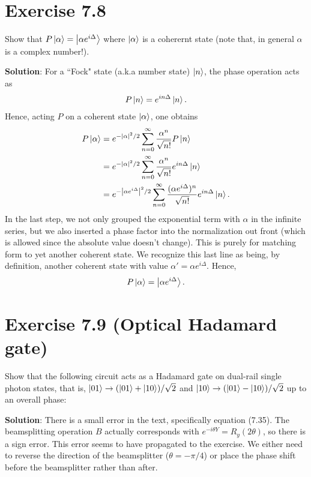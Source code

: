 \documentclass{book}
\begin{document}
\section*{Exercise 7.8}
    Show that $P\ket{\alpha} = \ket{\alpha e^{i\Delta}}$ where $\ket{\alpha}$ is a coherernt state (note that, in general $\alpha$ is a complex number!).

    \textbf{Solution}: For a ``Fock" state (a.k.a number state) $\ket{n}$, the phase operation acts as 
    \begin{align}
        P\ket{n} = e^{i n \Delta} \ket{n}.
    \end{align}
    Hence, acting $P$ on a coherent state $\ket{\alpha}$, one obtains
    \begin{align}
    \begin{aligned}
        P \ket{\alpha} &= e^{-\abs{\alpha}^2/2} \sum_{n=0}^\infty \frac{\alpha^n}{\sqrt{n!}} P\ket{n} \\
        &= e^{-\abs{\alpha}^2/2} \sum_{n=0}^\infty \frac{\alpha^n}{\sqrt{n!}} e^{i n\Delta}\ket{n} \\
        &= e^{-\abs{\alpha e^{i\Delta}}^2/2} \sum_{n=0}^\infty \frac{(\alpha e^{i\Delta})^n}{\sqrt{n!}} e^{i n\Delta}\ket{n}.
    \end{aligned}
    \end{align}
    In the last step, we not only grouped the exponential term with $\alpha$ in the infinite series, but we also inserted a phase factor into the normalization out front (which is allowed since the absolute value doesn't change). This is purely for matching form to yet another coherent state. We recognize this last line as being, by definition, another coherent state with value $\alpha' = \alpha e^{i\Delta}$. Hence,
    \begin{align}
        P\ket{\alpha} = \ket{\alpha e^{i\Delta}}.
    \end{align}

\section*{Exercise 7.9 (Optical Hadamard gate)}
    Show that the following circuit acts as a Hadamard gate on  dual-rail single photon states, that is, $\ket{01} \to (\ket{01} + \ket{10})/\sqrt{2}$ and $\ket{10}\to (\ket{01} - \ket{10})/\sqrt{2}$ up to an overall phase:

    \textbf{Solution}: There is a small error in the text, specifically equation (7.35). The beamsplitting operation $B$ actually corresponds with $e^{-i\theta Y} = R_y (2\theta)$, so there is a sign error. This error seems to have propagated to the exercise. We either need to reverse the direction of the beamsplitter ($\theta = -\pi/4$) or place the phase shift before the beamsplitter rather than after.
    
\end{document}
